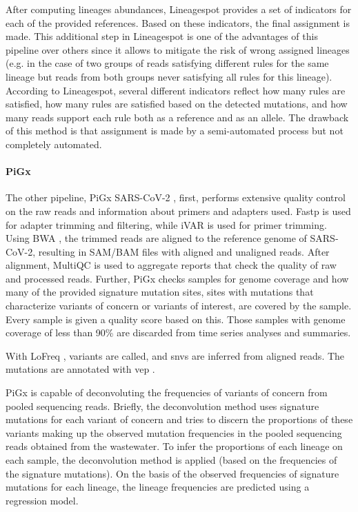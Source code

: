         After computing lineages abundances, Lineagespot provides a set of indicators for each of the provided references. Based on these indicators, the final assignment is made. This additional step in Lineagespot is one of the advantages of this pipeline over others since it allows to mitigate the risk of wrong assigned lineages (e.g. in the case of two groups of reads satisfying different rules for the same lineage but reads from both groups never satisfying all rules for this lineage). According to Lineagespot, several different indicators reflect how many rules are satisfied, how many rules are satisfied based on the detected mutations, and how many reads support each rule both as a reference and as an allele. The drawback of this method is that assignment is made by a semi-automated process but not completely automated.
        \paragraph{PiGx}
        The other pipeline, PiGx SARS-CoV-2 \cite{schumann2021}, first, performs extensive quality control on the raw reads and information about primers and adapters used. Fastp \cite{chen2018} is used for adapter trimming and filtering, while iVAR is used for primer trimming. Using BWA \cite{li2013}, the trimmed reads are aligned to the reference genome of SARS-CoV-2, resulting in SAM/BAM files with aligned and unaligned reads. After alignment, MultiQC \cite{multiqc} is used to aggregate reports that check the quality of raw and processed reads. Further, PiGx checks samples for genome coverage and how many of the provided signature mutation sites, sites with mutations that characterize variants of concern or variants of interest, are covered by the sample. Every sample is given a quality score based on this. Those samples with genome coverage of less than 90\% are discarded from time series analyses and summaries.

        With LoFreq \cite{lofreq}, variants are called, and \acrshort{snvs} are inferred from aligned reads. The mutations are annotated with \acrshort{vep} \cite{mclaren2016}. 
        
        PiGx is capable of deconvoluting the frequencies of variants of concern from pooled sequencing reads. Briefly, the deconvolution method uses signature mutations for each variant of concern and tries to discern the proportions of these variants making up the observed mutation frequencies in the pooled sequencing reads obtained from the wastewater. To infer the proportions of each lineage on each sample, the deconvolution method is applied (based on the frequencies of the signature mutations). On the basis of the observed frequencies of signature mutations for each lineage, the lineage frequencies are predicted using a regression model. 
        
